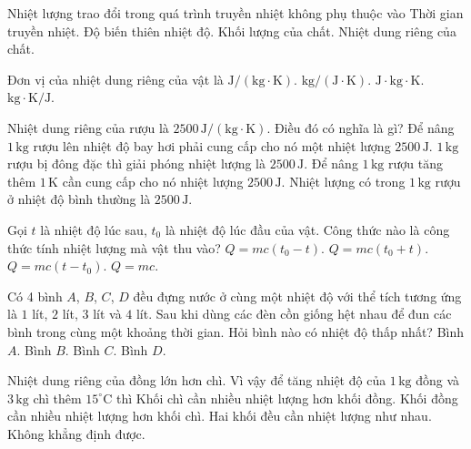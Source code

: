 \begin{ex}
Nhiệt lượng trao đổi trong quá trình truyền nhiệt không phụ thuộc vào
\choice
{\True Thời gian truyền nhiệt.}
{Độ biến thiên nhiệt độ.}
{Khối lượng của chất.}
{Nhiệt dung riêng của chất.}
\end{ex}
\begin{ex}
Đơn vị của nhiệt dung riêng của vật là
\choice
{\True $\mathrm{J/(kg\cdot K)}$.}
{$\mathrm{kg/(J\cdot K)}$.}
{$\mathrm{J\cdot kg\cdot K}$.}
{$\mathrm{kg\cdot K/J}$.}
\end{ex}
\begin{ex}
Nhiệt dung riêng của rượu là $2500\,\mathrm{J/(kg\cdot K)}$. Điều đó có nghĩa là gì?
\choice
{Để nâng $1\,\mathrm{kg}$ rượu lên nhiệt độ bay hơi phải cung cấp cho nó một nhiệt lượng $2500\,\mathrm{J}$.}
{$1\,\mathrm{kg}$ rượu bị đông đặc thì giải phóng nhiệt lượng là $2500\,\mathrm{J}$.}
{\True Để nâng $1\,\mathrm{kg}$ rượu tăng thêm $1\,\mathrm{K}$ cần cung cấp cho nó nhiệt lượng $2500\,\mathrm{J}$.}
{Nhiệt lượng có trong $1\,\mathrm{kg}$ rượu ở nhiệt độ bình thường là $2500\,\mathrm{J}$.}
\end{ex}
\begin{ex}
Gọi $t$ là nhiệt độ lúc sau, $t_0$ là nhiệt độ lúc đầu của vật. Công thức nào là công thức tính nhiệt lượng mà vật thu vào?
\choice
{$Q=mc(t_0-t)$.}
{$Q=mc(t_0+t)$.}
{\True $Q=mc(t-t_0)$.}
{$Q=mc$.}
\end{ex}
\begin{ex}
Có 4 bình $A$, $B$, $C$, $D$ đều đựng nước ở cùng một nhiệt độ với thể tích tương ứng là $1$ lít, $2$ lít, $3$ lít và $4$ lít. Sau khi dùng các đèn cồn giống hệt nhau để đun các bình trong cùng một khoảng thời gian. Hỏi bình nào có nhiệt độ thấp nhất?
\choice
{Bình $A$.}
{Bình $B$.}
{Bình $C$.}
{\True Bình $D$.}
\end{ex}
\begin{ex}
Nhiệt dung riêng của đồng lớn hơn chì. Vì vậy để tăng nhiệt độ của $1\,\mathrm{kg}$ đồng và $3\,\mathrm{kg}$ chì thêm $15^\circ\mathrm{C}$ thì
\choice
{Khối chì cần nhiều nhiệt lượng hơn khối đồng.}
{\True Khối đồng cần nhiều nhiệt lượng hơn khối chì.}
{Hai khối đều cần nhiệt lượng như nhau.}
{Không khẳng định được.}
\end{ex}
